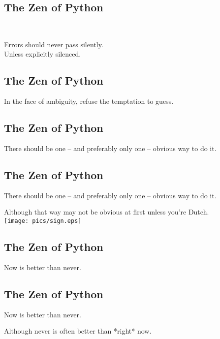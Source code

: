\documentclass[xga]{xdvislides}
\begin{document}
\subsection{The Zen of Python}
\\
\begin{center}
    Errors should never pass silently. \\
\addvspace{.5in}
    Unless explicitly silenced.
\end{center}

\subsection{The Zen of Python}
\begin{center}
    In the face of ambiguity, refuse the temptation to guess.
\end{center}

\subsection{The Zen of Python}
\begin{center}
    There should be one -- and preferably only one -- obvious way to do it.
\end{center}

\subsection{The Zen of Python}
\begin{center}
    There should be one -- and preferably only one -- obvious way to do it.

\addvspace{.5in}

    Although that way may not be obvious at first unless you're Dutch. \\
\vspace*{\fill}
	\texttt{[image: pics/sign.eps]}
\end{center}


\subsection{The Zen of Python}
\begin{center}
    Now is better than never.
\end{center}

\subsection{The Zen of Python}
\begin{center}
    Now is better than never.  \\

\addvspace{.5in}

    Although never is often better than *right* now.
\end{center}
\end{document}
